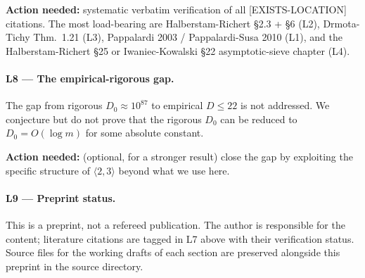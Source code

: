 \documentclass[11pt,a4paper]{article}
\theoremstyle{plain}
\theoremstyle{definition}
\theoremstyle{remark}
\begin{document}
\textbf{Action needed:} systematic verbatim verification of all
[EXISTS-LOCATION] citations. The most load-bearing are
Halberstam-Richert \S2.3 + \S6 (L2), Drmota-Tichy Thm.~1.21 (L3),
Pappalardi 2003 / Pappalardi-Susa 2010 (L1), and the
Halberstam-Richert \S25 or Iwaniec-Kowalski \S22 asymptotic-sieve
chapter (L4).

\paragraph{L8 --- The empirical-rigorous gap.}
The gap from rigorous $D_{0} \approx 10^{87}$ to empirical $D \leq 22$
is not addressed. We conjecture but do not prove that the rigorous
$D_{0}$ can be reduced to $D_{0} = O(\log m)$ for some absolute
constant.

\textbf{Action needed:} (optional, for a stronger result) close the
gap by exploiting the specific structure of $\langle 2, 3 \rangle$
beyond what we use here.

\paragraph{L9 --- Preprint status.}
This is a preprint, not a refereed publication. The author is
responsible for the content; literature citations are tagged in L7
above with their verification status. Source files for the working
drafts of each section are preserved alongside this preprint in the
source directory.

\end{document}
